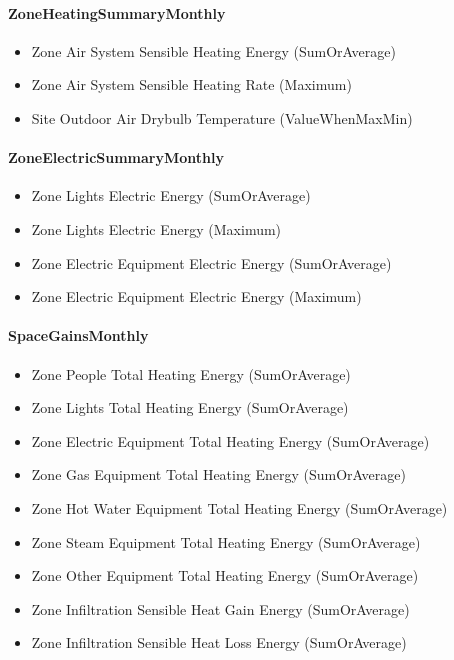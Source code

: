 \paragraph{ZoneHeatingSummaryMonthly}\label{zoneheatingsummarymonthly}

\begin{itemize}
\item
  Zone Air System Sensible Heating Energy (SumOrAverage)
\item
  Zone Air System Sensible Heating Rate (Maximum)
\item
  Site Outdoor Air Drybulb Temperature (ValueWhenMaxMin)
\end{itemize}

\paragraph{ZoneElectricSummaryMonthly}\label{zoneelectricsummarymonthly}

\begin{itemize}
\item
  Zone Lights Electric Energy (SumOrAverage)
\item
  Zone Lights Electric Energy (Maximum)
\item
  Zone Electric Equipment Electric Energy (SumOrAverage)
\item
  Zone Electric Equipment Electric Energy (Maximum)
\end{itemize}

\paragraph{SpaceGainsMonthly}\label{spacegainsmonthly}

\begin{itemize}
\item
  Zone People Total Heating Energy (SumOrAverage)
\item
  Zone Lights Total Heating Energy (SumOrAverage)
\item
  Zone Electric Equipment Total Heating Energy (SumOrAverage)
\item
  Zone Gas Equipment Total Heating Energy (SumOrAverage)
\item
  Zone Hot Water Equipment Total Heating Energy (SumOrAverage)
\item
  Zone Steam Equipment Total Heating Energy (SumOrAverage)
\item
  Zone Other Equipment Total Heating Energy (SumOrAverage)
\item
  Zone Infiltration Sensible Heat Gain Energy (SumOrAverage)
\item
  Zone Infiltration Sensible Heat Loss Energy (SumOrAverage)
\end{itemize}

